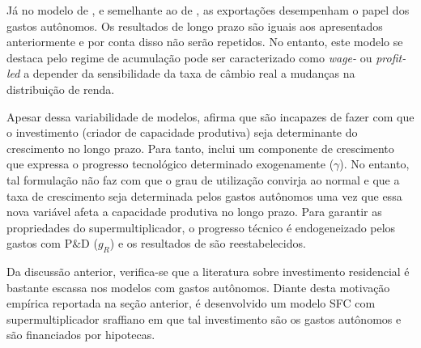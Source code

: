 
Já no modelo de \textcite{nah_long-run_2017}, e semelhante ao de \textcite{dejuan_hidden_2017}, as exportações desempenham o papel dos gastos autônomos. Os resultados de longo prazo são iguais aos apresentados anteriormente e por conta disso não serão repetidos. No entanto, este modelo se destaca pelo regime de acumulação pode ser caracterizado como \textit{wage-} ou \textit{profit-led} a depender da sensibilidade da taxa de câmbio real a mudanças na distribuição de renda. 

Apesar dessa variabilidade de modelos, \textcite{dutt_observations_2018} afirma que são incapazes de fazer com que o investimento (criador de capacidade produtiva) seja determinante do crescimento no longo prazo. Para tanto, inclui um componente de crescimento que expressa o progresso tecnológico determinado exogenamente ($\gamma$). No entanto, tal formulação não faz com que o grau de utilização convirja ao normal e que a taxa de crescimento seja determinada pelos gastos autônomos uma vez que essa nova variável afeta a capacidade produtiva no longo prazo. Para garantir as propriedades do supermultiplicador, o progresso técnico é endogeneizado pelos gastos com P\&D ($g_R$) e os resultados de \textcite{allain_macroeconomic_2014} são reestabelecidos.

Da discussão anterior, verifica-se que a literatura sobre investimento residencial é bastante escassa nos modelos com gastos autônomos. Diante desta motivação empírica reportada na seção anterior, é desenvolvido um modelo SFC com supermultiplicador sraffiano em que tal investimento são os gastos autônomos e são financiados por hipotecas.